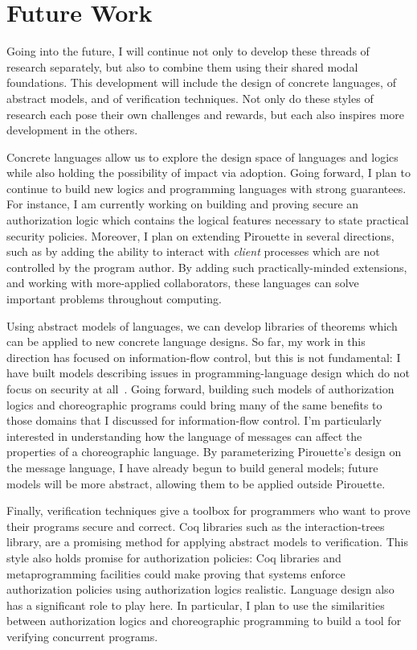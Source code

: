 \documentclass{article}
\theoremstyle{definition}
\begin{document}
\section*{Future Work}

Going into the future, I will continue not only to develop these threads of research separately, but also to combine them using their shared modal foundations.
This development will include the design of concrete languages, of abstract models, and of verification techniques.
Not only do these styles of research each pose their own challenges and rewards, but each also inspires more development in the others.

Concrete languages allow us to explore the design space of languages and logics while also holding the possibility of impact via adoption.
Going forward, I plan to continue to build new logics and programming languages with strong guarantees.
For instance, I am currently working on building and proving secure an authorization logic which contains the logical features necessary to state practical security policies.
Moreover, I plan on extending Pirouette in several directions, such as by adding the ability to interact with \emph{client} processes which are not controlled by the program author.
By adding such practically-minded extensions, and working with more-applied collaborators, these languages can solve important problems throughout computing.

Using abstract models of languages, we can develop libraries of theorems which can be applied to new concrete language designs.
So far, my work in this direction has focused on information-flow control, but this is not fundamental: I have built models describing issues in programming-language design which do not focus on security at all~\citep{HirschT18}.
Going forward, building such models of authorization logics and choreographic programs could bring many of the same benefits to those domains that I discussed for information-flow control.
I'm particularly interested in understanding how the language of messages can affect the properties of a choreographic language.
By parameterizing Pirouette's design on the message language, I have already begun to build general models; future models will be more abstract, allowing them to be applied outside Pirouette.

Finally, verification techniques give a toolbox for programmers who want to prove their programs secure and correct.
Coq libraries such as the interaction-trees library, are a promising method for applying abstract models to verification.
This style also holds promise for authorization policies: Coq libraries and metaprogramming facilities could make proving that systems enforce authorization policies using authorization logics realistic.
Language design also has a significant role to play here.
In particular, I plan to use the similarities between authorization logics and choreographic programming to build a tool for verifying concurrent programs.


\end{document}
